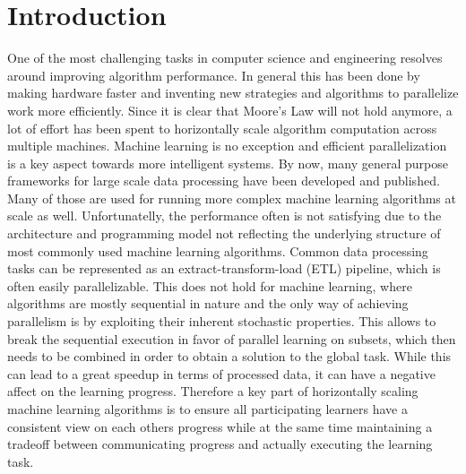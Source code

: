 \chapter{Introduction}
One of the most challenging tasks in computer science and engineering resolves around improving algorithm performance.
In general this has been done by making hardware faster and inventing new strategies and algorithms to parallelize work more efficiently.
Since it is clear that Moore's Law will not hold anymore, a lot of effort has been spent to horizontally scale algorithm computation across multiple machines.
Machine learning is no exception and efficient parallelization is a key aspect towards more intelligent systems.
By now, many general purpose frameworks for large scale data processing have been developed and published. Many of those are used for running more complex machine learning algorithms at scale as well.
Unfortunatelly, the performance often is not satisfying due to the architecture and programming model not reflecting the underlying structure of most commonly used machine learning algorithms.
Common data processing tasks can be represented as an extract-transform-load (ETL) pipeline, which is often easily parallelizable. This does not hold for machine learning, where algorithms are mostly sequential in nature and the only way of achieving parallelism is by exploiting their inherent stochastic properties. This allows to break the sequential execution in favor of parallel learning on subsets, which then needs to be combined in order to obtain a solution to the global task.
While this can lead to a great speedup in terms of processed data, it can have a negative affect on the learning progress.
Therefore a key part of horizontally scaling machine learning algorithms is to ensure all participating learners have a consistent view on each others progress while at the same time maintaining a tradeoff between communicating progress and actually executing the learning task.


